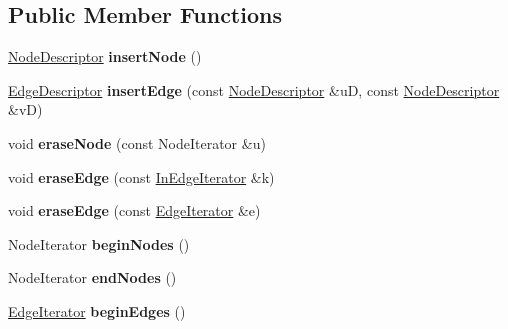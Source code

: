 \subsection*{Public Member Functions}
\begin{DoxyCompactItemize}
\item 
\hypertarget{class_packed_memory_array_impl_a3ce2025a4671f367cd14bcc8f222c7bd}{
\hyperlink{class_p_m_a_node}{NodeDescriptor} {\bfseries insertNode} ()}
\label{class_packed_memory_array_impl_a3ce2025a4671f367cd14bcc8f222c7bd}

\item 
\hypertarget{class_packed_memory_array_impl_aa03bb8c1723c757c1842d292af619502}{
\hyperlink{class_p_m_a_edge}{EdgeDescriptor} {\bfseries insertEdge} (const \hyperlink{class_p_m_a_node}{NodeDescriptor} \&uD, const \hyperlink{class_p_m_a_node}{NodeDescriptor} \&vD)}
\label{class_packed_memory_array_impl_aa03bb8c1723c757c1842d292af619502}

\item 
\hypertarget{class_packed_memory_array_impl_ad10e5616f6aef2b449eaf4585ce726af}{
void {\bfseries eraseNode} (const NodeIterator \&u)}
\label{class_packed_memory_array_impl_ad10e5616f6aef2b449eaf4585ce726af}

\item 
\hypertarget{class_packed_memory_array_impl_a17d0e06d2149ee497456a8e4a9c6d1e6}{
void {\bfseries eraseEdge} (const \hyperlink{class_packed_memory_array_1_1_iterator}{InEdgeIterator} \&k)}
\label{class_packed_memory_array_impl_a17d0e06d2149ee497456a8e4a9c6d1e6}

\item 
\hypertarget{class_packed_memory_array_impl_af2bc9a26e0e4a345a008856c64b27cab}{
void {\bfseries eraseEdge} (const \hyperlink{class_packed_memory_array_1_1_iterator}{EdgeIterator} \&e)}
\label{class_packed_memory_array_impl_af2bc9a26e0e4a345a008856c64b27cab}

\item 
\hypertarget{class_packed_memory_array_impl_a6fd81f7eb93aa31c2ef265465f28fff2}{
NodeIterator {\bfseries beginNodes} ()}
\label{class_packed_memory_array_impl_a6fd81f7eb93aa31c2ef265465f28fff2}

\item 
\hypertarget{class_packed_memory_array_impl_a4834b776c492d5b30ef511e8f0fc2b90}{
NodeIterator {\bfseries endNodes} ()}
\label{class_packed_memory_array_impl_a4834b776c492d5b30ef511e8f0fc2b90}

\item 
\hypertarget{class_packed_memory_array_impl_a9fa86225956b6e669497807eecda1556}{
\hyperlink{class_packed_memory_array_1_1_iterator}{EdgeIterator} {\bfseries beginEdges} ()}
\label{class_packed_memory_array_impl_a9fa86225956b6e669497807eecda1556}


\end{DoxyCompactItemize}
